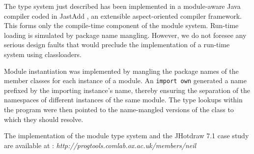 The type system just described has been implemented in a
module-aware Java compiler coded in JastAdd \cite{jastadd},
an extensible aspect-oriented compiler framework. This forms
only the compile-time component of the module system. Run-time
loading is simulated by package name mangling. However,
we do not foresee any serious design faults that would preclude
the implementation of a run-time system using classloaders.

Module instantiation was implemented by mangling
the package names of the member classes for each instance of 
a module. An \texttt{import own} generated a name prefixed by 
the importing instance's name, thereby ensuring the separation
of the namespaces of different instances of the same module.
The type lookups within the program were then pointed to the
name-mangled versions of the class to which they should resolve.

The implementation of the module type system and the 
JHotdraw 7.1 case study are available at : 
\textit{http://progtools.comlab.ox.ac.uk/members/neil}

